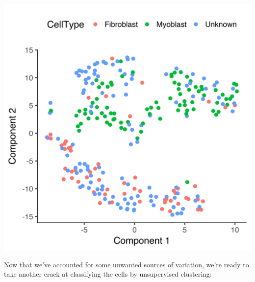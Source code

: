 \documentclass[10pt,oneside]{article}\usepackage[]{graphicx}\usepackage[]{color}
\makeatletter
\def\maxwidth{ %
  \ifdim\Gin@nat@width>\linewidth
    \linewidth
  \else
    \Gin@nat@width
  \fi
}
\newenvironment{knitrout}{}{} %
\makeatother
\begin{document}
\begin{knitrout}
{\centering \includegraphics[width=\maxwidth]{figure/cluster_cells_unsup_control_for_media-1} 

}



\end{knitrout}

Now that we've accounted for some unwanted sources of variation, we're ready to take another crack at classifying the cells by unsupervised clustering:
\end{document}
